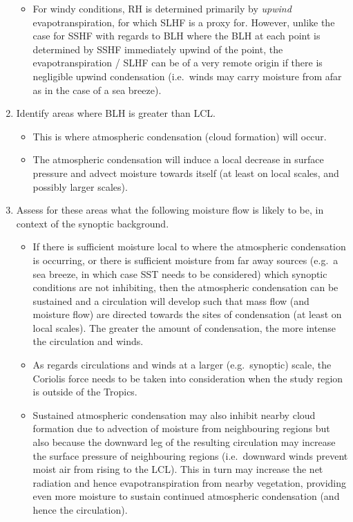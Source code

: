 \begin{enumerate}
\begin{itemize}
		\item For windy conditions, \ac{RH} is determined primarily by \textit{upwind} evapotranspiration, for which \ac{SLHF} is a proxy for. However, unlike the case for \ac{SSHF} with regards to \ac{BLH} where the \ac{BLH} at each point is determined by \ac{SSHF} immediately upwind of the point, the evapotranspiration / \ac{SLHF} can be of a very remote origin if there is negligible upwind condensation (i.e.\ winds may carry moisture from afar as in the case of a sea breeze).
	\end{itemize}
	\item Identify areas where \ac{BLH} is greater than \ac{LCL}.
	\begin{itemize}
		\item This is where atmospheric condensation (cloud formation) will occur.
		\item The atmospheric condensation will induce a local decrease in surface pressure and advect moisture towards itself (at least on local scales, and possibly larger scales).
	\end{itemize}
	\item Assess for these areas what the following moisture flow is likely to be, in context of the synoptic background.
	\begin{itemize}
		\item If there is sufficient moisture local to where the atmospheric condensation is occurring, or there is sufficient moisture from far away sources (e.g.\ a sea breeze, in which case \ac{SST} needs to be considered) which synoptic conditions are not inhibiting, then the atmospheric condensation can be sustained and a circulation will develop such that mass flow (and moisture flow) are directed towards the sites of condensation (at least on local scales). The greater the amount of condensation, the more intense the circulation and winds.
		\item As regards circulations and winds at a larger (e.g.\ synoptic) scale, the Coriolis force needs to be taken into consideration when the study region is outside of the Tropics.
		\item Sustained atmospheric condensation may also inhibit nearby cloud formation due to advection of moisture from neighbouring regions but also because the downward leg of the resulting circulation may increase the surface pressure of neighbouring regions (i.e.\ downward winds prevent moist air from rising to the \ac{LCL}). This in turn may increase the net radiation and hence evapotranspiration from nearby vegetation, providing even more moisture to sustain continued atmospheric condensation (and hence the circulation).

\end{itemize}
\end{enumerate}
